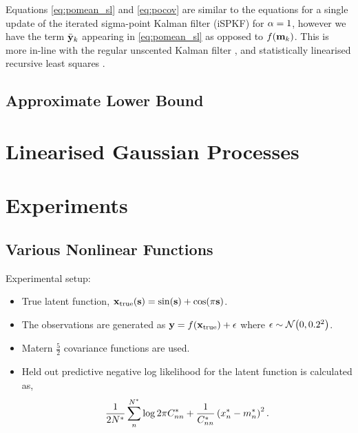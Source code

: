 \documentclass{article} %
\begin{document}
Equations \eqref{eq:pomean_sl} and \eqref{eq:pocov} are similar to the
equations for a single update of the iterated sigma-point Kalman filter (iSPKF)
\cite{Sibley2006} for $\alpha = 1$, however we have the term $\bar{\mathbf{y}}_k$
appearing in \eqref{eq:pomean_sl} as opposed to $f\!\left({{\mathbf{m}_k}}\right)$. This is
more in-line with the regular unscented Kalman filter \cite{Julier2004}, and
statistically linearised recursive least squares \cite{Geist2010}.

\subsection{Approximate Lower Bound}


\section{Linearised Gaussian Processes}

\section{Experiments}


\subsection{Various Nonlinear Functions}

Experimental setup:
\begin{itemize}

    \item True latent function, $\mathbf{x}_{\text{true}}\!\left({\mathbf{s}}\right) =
        \sin\!\left({\mathbf{s}}\right) + \cos\!\left({\pi\mathbf{s}}\right)$.

    \item The observations are generated as $\mathbf{y} =
        f\!\left({{\mathbf{x}_\text{true}}}\right) + \epsilon$ where $\epsilon \sim \mathcal{N}\!\left({0,
            0.2^2}\right)$.
    
    \item Matern $\frac{5}{2}$ covariance functions are used. 

    \item Held out predictive negative log likelihood for the latent function
        is calculated as,
        \begin{equation}
            \frac{1}{2N^{*}} \sum^{N^{*}}_n \log{2\pi\ensuremath{C}\ensuremath{^{*}}_{nn}}
                + \frac{1}{C^{*}_{nn}} \left({x^{*}_n -
                    m^{*}_n}\right)^2.
        \end{equation}

\end{itemize}
\end{document}
